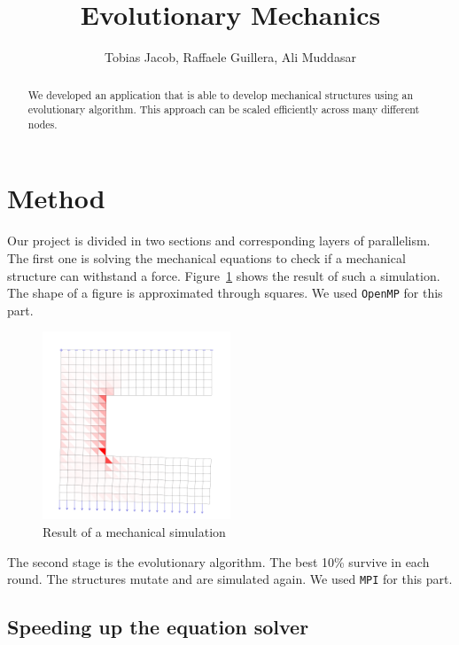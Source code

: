 \documentclass[12pt]{article}
\title{Evolutionary Mechanics}
\author{Tobias Jacob, Raffaele Guillera, Ali Muddasar}
\begin{document}
\maketitle

\begin{abstract}
    We developed an application that is able to develop mechanical structures using an evolutionary algorithm. This approach can be scaled efficiently across many different nodes.
\end{abstract}

\section{Method}

Our project is divided in two sections and corresponding layers of parallelism. The first one is solving the mechanical equations to check if a mechanical structure can withstand a force. Figure~\ref{fig:Mechanical_Simulation} shows the result of such a simulation. The shape of a figure is approximated through squares. We used \texttt{OpenMP} for this part.

\begin{figure}[h]
    \centering
    \includegraphics[width=0.5\textwidth, trim={0pt 0pt 0pt 5em}, clip]{images/MechaincalStructure.png}
    \caption{Result of a mechanical simulation}
    \label{fig:Mechanical_Simulation}
\end{figure}


The second stage is the evolutionary algorithm. The best 10\% survive in each round. The structures mutate and are simulated again. We used \texttt{MPI} for this part.

\subsection{Speeding up the equation solver}
\end{document}
